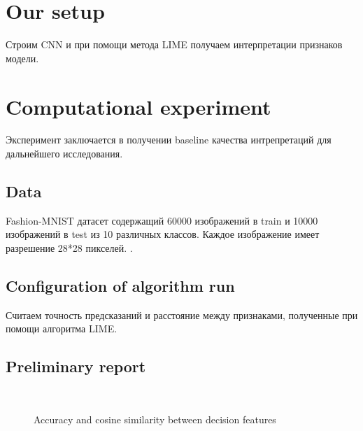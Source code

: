 \documentclass[12pt]{article}
\begin{document}
\section{Our setup}

Строим CNN и при помощи метода LIME получаем интерпретации признаков модели.

\section{Computational experiment}

Эксперимент заключается в получении baseline качества интрепретаций для дальнейшего исследования.

\subsection{Data}

  Fashion-MNIST датасет содержащий 60000 изображений в train и 10000 изображений в test из 10 различных классов. Каждое изображение имеет разрешение 28*28 пикселей.  \citep{fashionmnist}.

\subsection{Configuration of algorithm run}

Считаем точность предсказаний и расстояние между признаками, полученные при помощи алгоритма LIME.

\subsection{Preliminary report}


\begin{figure}[!t]
  \\
 \caption{Accuracy and cosine similarity between decision features}
  \label{fig:1}
\end{figure}

\newpage



\end{document}
